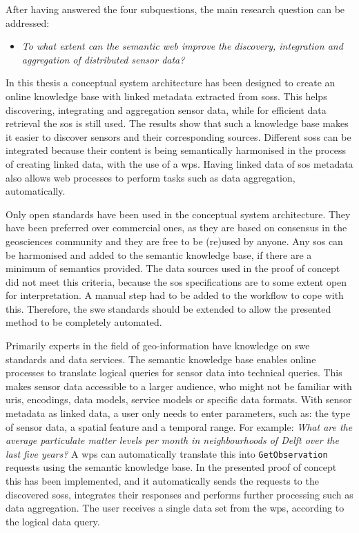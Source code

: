 \noindent After having answered the four subquestions, the main research question can be addressed:

\begin{itemize}
	\item \textit{To what extent can the semantic web improve the discovery, integration and aggregation of distributed sensor data?}
\end{itemize}

In this thesis a conceptual system architecture has been designed to create an online knowledge base with linked metadata extracted from \aclp{sos}. This helps discovering, integrating and aggregation sensor data, while for efficient data retrieval the \ac{sos} is still used. The results show that such a knowledge base makes it easier to discover sensors and their corresponding sources. Different \aclp{sos} can be integrated because their content is being semantically harmonised in the process of creating linked data, with the use of a \ac{wps}. Having linked data of \ac{sos} metadata also allows web processes to perform tasks such as data aggregation, automatically.

Only open standards have been used in the conceptual system architecture. They have been preferred over commercial ones, as they are based on consensus in the geosciences community and they are free to be (re)used by anyone. Any \ac{sos} can be harmonised and added to the semantic knowledge base, if there are a minimum of semantics provided. The data sources used in the proof of concept did not meet this criteria, because the \ac{sos} specifications are to some extent open for interpretation. A manual step had to be added to the workflow to cope with this. Therefore, the \ac{swe} standards should be extended to allow the presented method to be completely automated. 

Primarily experts in the field of geo-information have knowledge on \ac{swe} standards and data services. The semantic knowledge base enables online processes to translate logical queries for sensor data into technical queries. This makes sensor data accessible to a larger audience, who might not be familiar with \acp{uri}, encodings, data models, service models or specific data formats. With sensor metadata as linked data, a user only needs to enter parameters, such as: the type of sensor data, a spatial feature and a temporal range. For example: \textit{What are the average particulate matter levels per month in neighbourhoods of Delft over the last five years?} A \ac{wps} can automatically translate this into \texttt{GetObservation} requests using the semantic knowledge base. In the presented proof of concept this has been implemented, and it automatically sends the requests to the discovered \aclp{sos}, integrates their responses and performs further processing such as data aggregation. The user receives a single data set from the \ac{wps}, according to the logical data query.   


